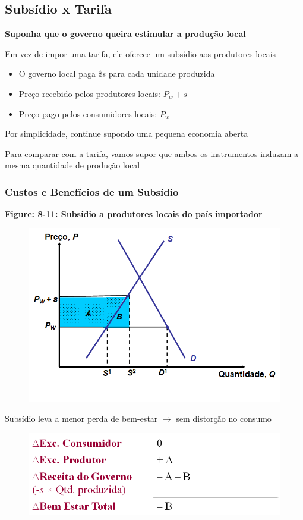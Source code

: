 \documentclass[a4paper,12pt]{article}[abntex2]
\begin{document}
\subsection{\textbf{Subsídio x Tarifa}}
\textbf{Suponha que o governo queira estimular a produção local}

Em vez de impor uma tarifa, ele oferece um subsídio aos produtores locais
\begin{itemize}
  \item O governo local paga \$s para cada unidade produzida
  \item Preço recebido pelos produtores locais: $P_w + s$
  \item Preço pago pelos consumidores locais: $P_w$
\end{itemize}

Por simplicidade, continue supondo uma pequena economia aberta

Para comparar com a tarifa, vamos supor que ambos os instrumentos induzam a mesma quantidade de produção local

\subsubsection{\textbf{Custos e Benefícios de um Subsídio}}
\textbf{Figure: 8-11: Subsídio a produtores locais do país importador}
\begin{figure}[H]
    \centering
    \includegraphics[width=0.7\linewidth]{Imagens/a20i7.png}
\end{figure}

Subsídio leva a menor perda de bem-estar \(\rightarrow\) sem distorção no consumo
\begin{figure}[H]
    \centering
    \includegraphics[width=0.75\linewidth]{Imagens/a20i8.png}
\end{figure}
\end{document}

